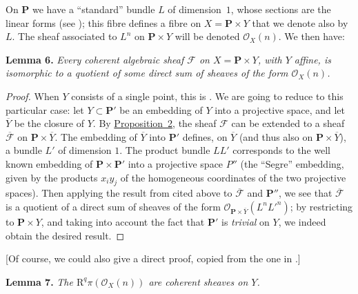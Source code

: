 \documentclass{article}
\newenvironment{itenv}[1]
  {\phantomsection\par\medskip\noindent\textbf{#1.}\itshape}
  {\medskip}
\newcommand{\scr}[1]{{\mathscr{#1}}}
\newcommand{\RR}{\mathrm{R}}
\newcommand{\PP}{\mathbf{P}}
\begin{document}
On $\PP$ we have a ``standard'' bundle $L$ of dimension~$1$, whose sections are the linear forms (see \cite[chap.~III, \S~2]{12});
this fibre defines a fibre on $X=\PP\times Y$ that we denote also by $L$.
The sheaf associated to $L^n$ on $\PP\times Y$ will be denoted $\scr{O}_X(n)$.
We then have:

\begin{itenv}{Lemma 6}
\label{lemma6}
  Every coherent algebraic sheaf $\scr{F}$ on $X=\PP\times Y$, with $Y$ affine, is isomorphic to a quotient of some direct sum of sheaves of the form $\scr{O}_X(n)$.
\end{itenv}

\begin{proof}
  When $Y$ consists of a single point, this is \cite[th\'{e}or\`{e}me~1, p.~247]{12}.  
  We are going to reduce to this particular case: let $Y\subset\PP'$ be an embedding of $Y$ into a projective space, and let $\overline{Y}$ be the closure of $Y$.
  By \hyperref[proposition2]{Proposition~2}, the sheaf $\scr{F}$ can be extended to a sheaf $\overline{\scr{F}}$ on $\PP\times\overline{Y}$.
  The embedding of $\overline{Y}$ into $\PP'$ defines, on $\overline{Y}$ (and thus also on $\PP\times\overline{Y}$), a bundle $L'$ of dimension $1$.
  The product bundle $LL'$ corresponds to the well known embedding of $\PP\times\PP'$ into a projective space $P''$ (the ``Segre'' embedding, given by the products $x_i y_j$ of the homogeneous coordinates of the two projective spaces).
  Then applying the result from \cite{12} cited above to $\overline{\scr{F}}$ and $\PP''$, we see that $\overline{\scr{F}}$ is a quotient of a direct sum of sheaves of the form $\scr{O}_{\PP\times\overline{Y}}(L^nL'^n)$;
  by restricting to $\PP\times Y$, and taking into account the fact that $\PP'$ is \emph{trivial} on $Y$, we indeed obtain the desired result.
\end{proof}

  [Of course, we could also give a direct proof, copied from the one in \cite{12}.]

\begin{itenv}{Lemma 7}
\label{lemma7}
  The $\RR^q\pi(\scr{O}_X(n))$ are coherent sheaves on $Y$.
\end{itenv}
\end{document}
